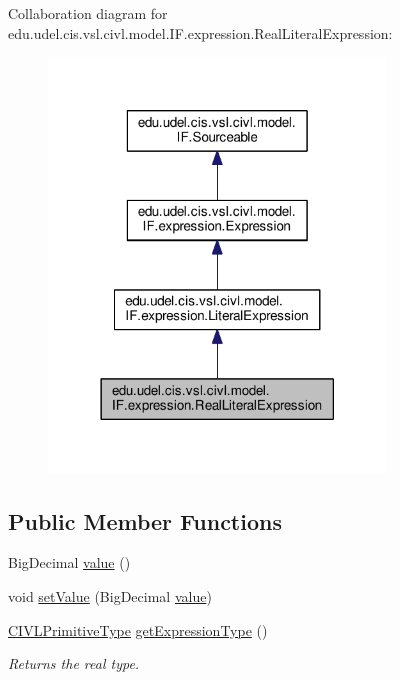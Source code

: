 Collaboration diagram for edu.\+udel.\+cis.\+vsl.\+civl.\+model.\+I\+F.\+expression.\+Real\+Literal\+Expression\+:
\nopagebreak
\begin{figure}[H]
\begin{center}
\leavevmode
\includegraphics[width=254pt]{interfaceedu_1_1udel_1_1cis_1_1vsl_1_1civl_1_1model_1_1IF_1_1expression_1_1RealLiteralExpression__coll__graph}
\end{center}
\end{figure}
\subsection*{Public Member Functions}
\begin{DoxyCompactItemize}
\item 
Big\+Decimal \hyperlink{interfaceedu_1_1udel_1_1cis_1_1vsl_1_1civl_1_1model_1_1IF_1_1expression_1_1RealLiteralExpression_a3d9a090adbb4fa8004ec62bc2d910f9c}{value} ()
\item 
void \hyperlink{interfaceedu_1_1udel_1_1cis_1_1vsl_1_1civl_1_1model_1_1IF_1_1expression_1_1RealLiteralExpression_a036f2a3279ccf8f9069b88673b2f5cd6}{set\+Value} (Big\+Decimal \hyperlink{interfaceedu_1_1udel_1_1cis_1_1vsl_1_1civl_1_1model_1_1IF_1_1expression_1_1RealLiteralExpression_a3d9a090adbb4fa8004ec62bc2d910f9c}{value})
\item 
\hypertarget{interfaceedu_1_1udel_1_1cis_1_1vsl_1_1civl_1_1model_1_1IF_1_1expression_1_1RealLiteralExpression_a8ba35cd96a25a23a414d039a4ecb7040}{}\hyperlink{interfaceedu_1_1udel_1_1cis_1_1vsl_1_1civl_1_1model_1_1IF_1_1type_1_1CIVLPrimitiveType}{C\+I\+V\+L\+Primitive\+Type} \hyperlink{interfaceedu_1_1udel_1_1cis_1_1vsl_1_1civl_1_1model_1_1IF_1_1expression_1_1RealLiteralExpression_a8ba35cd96a25a23a414d039a4ecb7040}{get\+Expression\+Type} ()\label{interfaceedu_1_1udel_1_1cis_1_1vsl_1_1civl_1_1model_1_1IF_1_1expression_1_1RealLiteralExpression_a8ba35cd96a25a23a414d039a4ecb7040}

\begin{DoxyCompactList}\small\item\em Returns the real type. \end{DoxyCompactList}\end{DoxyCompactItemize}


